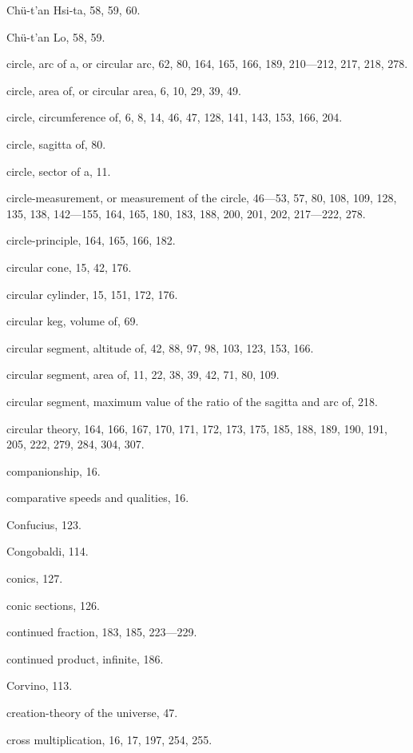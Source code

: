 \documentclass[11pt]{article}
\begin{document}
Chü-t'an Hsi-ta, 58, 59, 60.\par
Chü-t'an Lo, 58, 59.\par
circle, arc of a, or circular arc, 62, 80, 164, 165, 166, 189, 210---212, 217, 218, 278.\par
circle, area of, or circular area, 6, 10, 29, 39, 49.\par
circle, circumference of, 6, 8, 14, 46, 47, 128, 141, 143, 153, 166, 204.\par
circle, sagitta of, 80.\par
circle, sector of a, 11.\par
circle-measurement, or measurement of the circle, 46---53, 57, 80, 108, 109, 128, 135, 138, 142---155, 164, 165, 180, 183, 188, 200, 201, 202, 217---222, 278.\par
circle-principle, 164, 165, 166, 182.\par
circular cone, 15, 42, 176.\par
circular cylinder, 15, 151, 172, 176.\par
circular keg, volume of, 69.\par
circular segment, altitude of, 42, 88, 97, 98, 103, 123, 153, 166.\par
circular segment, area of, 11, 22, 38, 39, 42, 71, 80, 109.\par
circular segment, maximum value of the ratio of the sagitta and arc of, 218.\par
circular theory, 164, 166, 167, 170, 171, 172, 173, 175, 185, 188, 189, 190, 191, 205, 222, 279, 284, 304, 307.\par
companionship, 16.\par
comparative speeds and qualities, 16.\par
Confucius, 123.\par
Congobaldi, 114.\par
conics, 127.\par
conic sections, 126.\par
continued fraction, 183, 185, 223---229.\par
continued product, infinite, 186.\par
Corvino, 113.\par
creation-theory of the universe, 47.\par
cross multiplication, 16, 17, 197, 254, 255.\par
\end{document}
